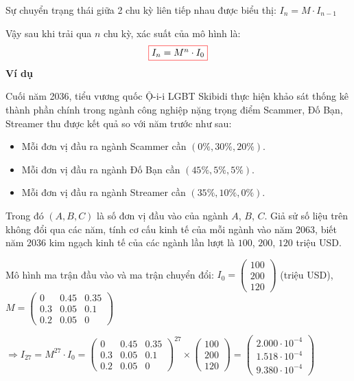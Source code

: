 \documentclass[twoside,final]{hcmut-report}
\newcommand{\exercise}[1]{\begin{exercisebox}#1\end{exercisebox}}
\newcommand{\result}[1]{\fcolorbox{red}{white}{#1}}
\begin{document}
Sự chuyển trạng thái giữa 2 chu kỳ liên tiếp nhau được biểu thị: $I_{n} = M\cdot I_{n-1}$\par
Vậy sau khi trải qua $n$ chu kỳ, xác suất của mô hình là: \[\result{$I_{n} = M^n\cdot I_0$}\]
\textbf{Ví dụ}
\exercise{Cuối năm 2036, tiểu vương quốc Ộ-i-i LGBT Skibidi thực hiện khảo sát thống kê thành phần chính trong ngành công nghiệp nặng trọng điểm Scammer, Đố Bạn, Streamer thu được kết quả so với năm trước như sau:
    \begin{itemize}[itemsep=0pt, topsep=0pt, parsep=0pt,label=-]
        \item Mỗi đơn vị đầu ra ngành Scammer cần $(0\%, 30\%, 20\%)$.
        \item Mỗi đơn vị đầu ra ngành Đố Bạn cần $(45\%, 5\%, 5\%)$.
        \item Mỗi đơn vị đầu ra ngành Streamer cần $(35\%, 10\%, 0\%)$.
    \end{itemize}

    Trong đó $(A, B, C)$ là số đơn vị đầu vào của ngành $A$, $B$, $C$. Giả sử số liệu trên không đổi qua các năm, tính cơ cấu kinh tế của mỗi ngành vào năm 2063, biết năm 2036 kim ngạch kinh tế của các ngành lần lượt là $100$, $200$, $120$ triệu USD.
}
Mô hình ma trận đầu vào và ma trận chuyển đổi: $I_0 = \begin{pmatrix}
        100 \\
        200 \\
        120
    \end{pmatrix}$ (triệu USD), $M = \begin{pmatrix}
        0   & 0.45 & 0.35 \\
        0.3 & 0.05 & 0.1  \\
        0.2 & 0.05 & 0
    \end{pmatrix}$

$\Rightarrow I_{27} = M^{27}\cdot I_0 = \begin{pmatrix}
        0   & 0.45 & 0.35 \\
        0.3 & 0.05 & 0.1  \\
        0.2 & 0.05 & 0
    \end{pmatrix}^{27} \times \begin{pmatrix}
        100 \\
        200 \\
        120
    \end{pmatrix} = \begin{pmatrix}
        2.000\cdot 10^{-4} \\
        1.518\cdot 10^{-4} \\
        9.380\cdot 10^{-4}
    \end{pmatrix}$
\end{document}
